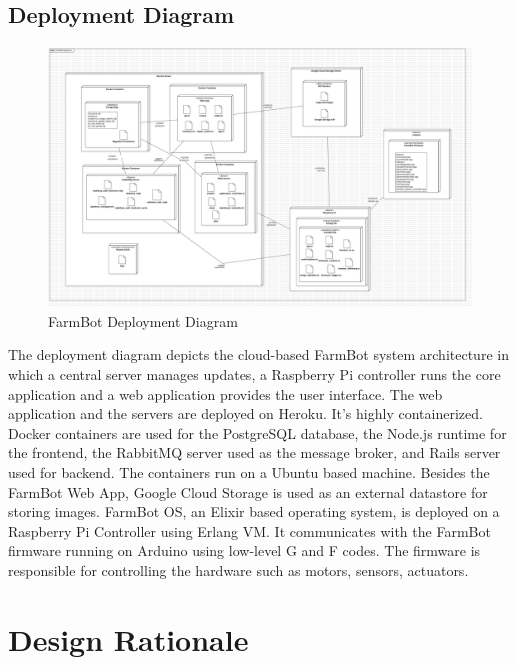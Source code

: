 \subsection{Deployment Diagram}

\begin{figure}[H]
    \centering
    \includegraphics[width=1\textwidth]{Figures/DeploymentDiagram.png}
    \caption{FarmBot Deployment Diagram}\label{fig:DeploymentDiagram}
\end{figure}

The deployment diagram depicts the cloud-based FarmBot system architecture in which a central server manages updates, a Raspberry Pi controller runs the core application and a web application provides the user interface. The web application and the servers are deployed on Heroku. It's highly containerized. Docker containers are used for the PostgreSQL database, the Node.js runtime for the frontend, the RabbitMQ server used as the message broker, and Rails server used for backend. The containers run on a Ubuntu based machine. Besides the FarmBot Web App, Google Cloud Storage is used as an external datastore for storing images. FarmBot OS, an Elixir based operating system, is deployed on a Raspberry Pi Controller using Erlang VM. It communicates with the FarmBot firmware running on Arduino using low-level G and F codes. The firmware is responsible for controlling the hardware such as motors, sensors, actuators.
\section{Design Rationale}

